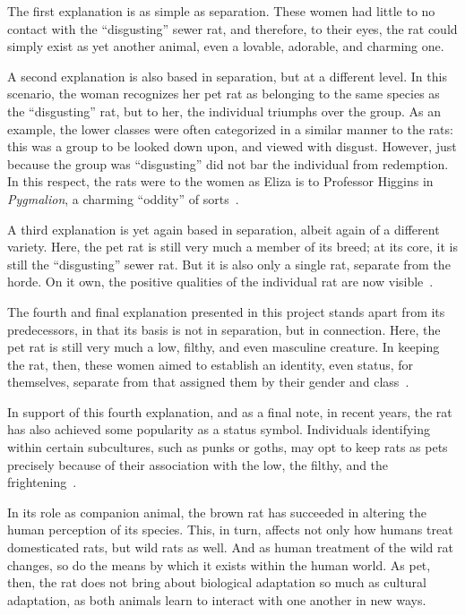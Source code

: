 \documentclass[12pt]{article}
\begin{document}
The first explanation is as simple as separation. These women had little to no contact with the ``disgusting'' sewer rat, and therefore, to their eyes, the rat could simply exist as yet another animal, even a lovable, adorable, and charming one.

A second explanation is also based in separation, but at a different level. In this scenario, the woman recognizes her pet rat as belonging to the same species as the ``disgusting'' rat, but to her, the individual triumphs over the group. As an example, the lower classes were often categorized in a similar manner to the rats: this was a group to be looked down upon, and viewed with disgust. However, just because the group was ``disgusting'' did not bar the individual from redemption. In this respect, the rats were to the women as Eliza is to Professor Higgins in \textit{Pygmalion}, a charming ``oddity'' of sorts~\cite{Edelman2002, Edelman2005}.

A third explanation is yet again based in separation, albeit again of a different variety. Here, the pet rat is still very much a member of its breed; at its core, it is still the ``disgusting'' sewer rat. But it is also only a single rat, separate from the horde. On it own, the positive qualities of the individual rat are now visible~\cite{Edelman2005}.

The fourth and final explanation presented in this project stands apart from its predecessors, in that its basis is not in separation, but in connection. Here, the pet rat is still very much a low, filthy, and even masculine creature. In keeping the rat, then, these women aimed to establish an identity, even status, for themselves, separate from that assigned them by their gender and class~\cite{Edelman2005}.

In support of this fourth explanation, and as a final note, in recent years, the rat has also achieved some popularity as a status symbol. Individuals identifying within certain subcultures, such as punks or goths, may opt to keep rats as pets precisely because of their association with the low, the filthy, and the frightening~\cite{Edelman2005}.

In its role as companion animal, the brown rat has succeeded in altering the human perception of its species. This, in turn, affects not only how humans treat domesticated rats, but wild rats as well. And as human treatment of the wild rat changes, so do the means by which it exists within the human world. As pet, then, the rat does not bring about biological adaptation so much as cultural adaptation, as both animals learn to interact with one another in new ways.
\end{document}
